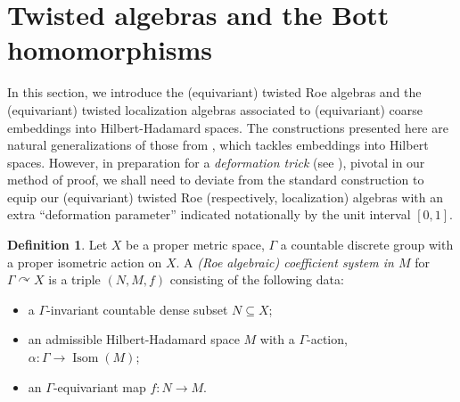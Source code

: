 \documentclass[11pt]{article}
\theoremstyle{definition}
\newtheorem{Def}{Definition}[section]
\theoremstyle{plain}
\def\Ga{\Gamma}
\def\car{\curvearrowright}
\begin{document}
\section{Twisted algebras and the Bott homomorphisms}\label{sec: Twisted algebras and the Bott homomorphisms}

In this section, we introduce the (equivariant) twisted Roe algebras and the (equivariant) twisted localization algebras associated to (equivariant) coarse embeddings into Hilbert-Hadamard spaces. The constructions presented here are natural generalizations of those from \cite{Yu2000}, which tackles embeddings into Hilbert spaces. 
However, in preparation for a \emph{deformation trick} (see ), pivotal in our method of proof, we shall need to deviate from the standard construction to equip our (equivariant) twisted Roe (respectively, localization) algebras with an extra ``deformation parameter'' indicated notationally by the unit interval $[0,1]$. 

\begin{Def}
Let $X$ be a proper metric space, $\Ga$ a countable discrete group with a proper isometric action on $X$. A \emph{(Roe algebraic) coefficient system in $M$} for $\Ga\car X$ is a triple $(N,M,f)$ consisting of the following data:\begin{itemize}
\item[(1)] a $\Ga$-invariant countable dense subset $N\subseteq X$;
\item[(2)] an admissible Hilbert-Hadamard space $M$ with a $\Ga$-action, $\alpha:\Ga\to\operatorname{Isom}(M)$;
\item[(3)] an $\Ga$-equivariant map $f:N\to M$.
\end{itemize}\end{Def}
\end{document}
